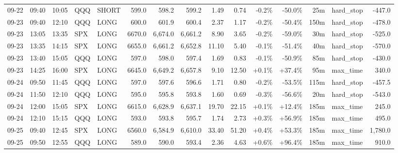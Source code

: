 \documentclass[11pt,a4paper,twoside]{article}
\begin{document}
\begin{landscape}
\begin{center}
\begin{longtable}{>{\color{txtmain}}l l l l l r r r r r r r r >{\color{txtmain}}l r}
09-22 & 09:40 & 10:05 & QQQ & SHORT & 599.0 & 598.2 & 599.2 & 1.49 & 0.74 & \textcolor{lossred}{-0.2\%} & \textcolor{lossred}{-50.0\%} & 25m & hard\_stop & \textcolor{lossred}{-447.0} \\
09-23 & 09:40 & 12:10 & QQQ & LONG & 600.0 & 601.9 & 600.4 & 2.37 & 1.17 & \textcolor{lossred}{-0.2\%} & \textcolor{lossred}{-50.4\%} & 150m & hard\_stop & \textcolor{lossred}{-478.0} \\
09-23 & 13:05 & 13:35 & SPX & LONG & 6670.0 & 6,674.0 & 6,661.2 & 8.90 & 3.65 & \textcolor{lossred}{-0.2\%} & \textcolor{lossred}{-59.0\%} & 30m & hard\_stop & \textcolor{lossred}{-525.0} \\
09-23 & 13:35 & 14:15 & SPX & LONG & 6655.0 & 6,661.2 & 6,652.8 & 11.10 & 5.40 & \textcolor{lossred}{-0.1\%} & \textcolor{lossred}{-51.4\%} & 40m & hard\_stop & \textcolor{lossred}{-570.0} \\
09-23 & 13:40 & 15:05 & QQQ & LONG & 597.0 & 598.0 & 597.4 & 1.69 & 0.83 & \textcolor{lossred}{-0.1\%} & \textcolor{lossred}{-50.9\%} & 85m & hard\_stop & \textcolor{lossred}{-430.0} \\
09-23 & 14:25 & 16:00 & SPX & LONG & 6645.0 & 6,649.2 & 6,657.8 & 9.10 & 12.50 & \textcolor{wingreen}{+0.1\%} & \textcolor{wingreen}{+37.4\%} & 95m & max\_time & \textcolor{wingreen}{340.0} \\
09-24 & 09:50 & 11:45 & QQQ & LONG & 597.0 & 597.6 & 596.6 & 1.71 & 0.80 & \textcolor{lossred}{-0.2\%} & \textcolor{lossred}{-53.5\%} & 115m & hard\_stop & \textcolor{lossred}{-457.5} \\
09-24 & 11:50 & 12:10 & QQQ & LONG & 595.0 & 595.8 & 593.8 & 1.60 & 0.69 & \textcolor{lossred}{-0.3\%} & \textcolor{lossred}{-56.6\%} & 20m & hard\_stop & \textcolor{lossred}{-543.0} \\
09-24 & 12:00 & 15:05 & SPX & LONG & 6615.0 & 6,628.9 & 6,637.1 & 19.70 & 22.15 & \textcolor{wingreen}{+0.1\%} & \textcolor{wingreen}{+12.4\%} & 185m & max\_time & \textcolor{wingreen}{245.0} \\
09-24 & 12:10 & 15:15 & QQQ & LONG & 593.0 & 593.8 & 595.7 & 1.74 & 2.73 & \textcolor{wingreen}{+0.3\%} & \textcolor{wingreen}{+56.9\%} & 185m & max\_time & \textcolor{wingreen}{495.0} \\
09-25 & 09:40 & 12:45 & SPX & LONG & 6560.0 & 6,584.9 & 6,610.0 & 33.40 & 51.20 & \textcolor{wingreen}{+0.4\%} & \textcolor{wingreen}{+53.3\%} & 185m & max\_time & \textcolor{wingreen}{1,780.0} \\
09-25 & 09:50 & 12:55 & QQQ & LONG & 589.0 & 590.0 & 593.4 & 2.36 & 4.63 & \textcolor{wingreen}{+0.6\%} & \textcolor{wingreen}{+96.4\%} & 185m & max\_time & \textcolor{wingreen}{910.0} \\

\end{longtable}
\end{center}
\end{landscape}
\end{document}
